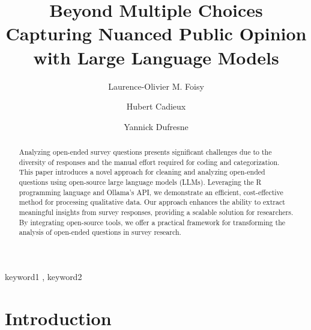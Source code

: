 \documentclass[
  authoryear,
  preprint,
  3p]{elsarticle}
\begin{document}
\begin{frontmatter}
\title{Beyond Multiple Choices \\\large{Capturing Nuanced Public Opinion
with Large Language Models} }
\author[1]{Laurence-Olivier M. Foisy%
%
}
\author[1]{Hubert Cadieux%
%
}
\author[1]{Yannick Dufresne%
%
}





        
\begin{abstract}
Analyzing open-ended survey questions presents significant challenges
due to the diversity of responses and the manual effort required for
coding and categorization. This paper introduces a novel approach for
cleaning and analyzing open-ended questions using open-source large
language models (LLMs). Leveraging the R programming language and
Ollama's API, we demonstrate an efficient, cost-effective method for
processing qualitative data. Our approach enhances the ability to
extract meaningful insights from survey responses, providing a scalable
solution for researchers. By integrating open-source tools, we offer a
practical framework for transforming the analysis of open-ended
questions in survey research.
\end{abstract}





\begin{keyword}
    keyword1 \sep 
    keyword2
\end{keyword}
\end{frontmatter}
    
\section{Introduction}\label{introduction}
\end{document}
